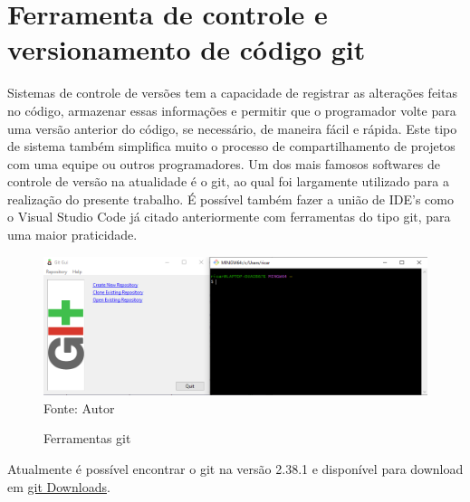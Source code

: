     \section{Ferramenta de controle e versionamento de código git} 
    Sistemas de controle de versões tem a capacidade de registrar as alterações feitas no código, armazenar essas informações e permitir que o programador volte para uma versão anterior do código, se necessário, de maneira fácil e rápida. Este tipo de sistema também simplifica muito o processo de compartilhamento de projetos com uma equipe ou outros programadores. Um dos mais famosos softwares de controle de versão na atualidade é o git, ao qual foi largamente utilizado para a realização do presente trabalho. É possível também fazer a união de IDE's como o Visual Studio Code já citado anteriormente com ferramentas do tipo git, para uma maior praticidade.
      \begin{figure}[H]
    	\begin{center}
    		\caption{Ferramentas git} \label{ling1}
    		\includegraphics[width=15cm]{git.PNG} \\
    		{\tiny \sf Fonte:{ Autor}}
    	\end{center}
    \end{figure}
Atualmente é possível encontrar o git na versão 2.38.1 e disponível para download em \href{https://git-scm.com/download/win}{git Downloads}.